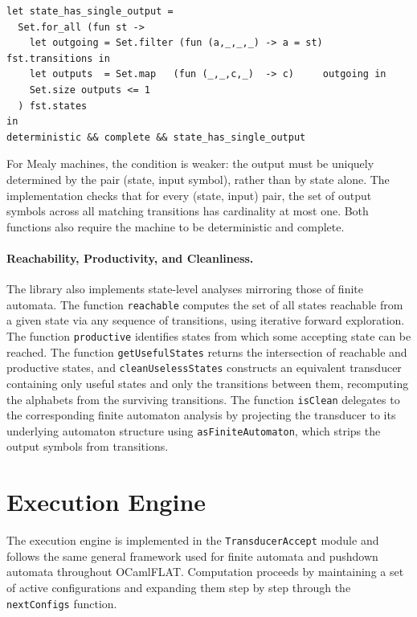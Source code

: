 \begin{verbatim}
let state_has_single_output =
  Set.for_all (fun st ->
    let outgoing = Set.filter (fun (a,_,_,_) -> a = st) fst.transitions in
    let outputs  = Set.map   (fun (_,_,c,_)  -> c)     outgoing in
    Set.size outputs <= 1
  ) fst.states
in
deterministic && complete && state_has_single_output
\end{verbatim}

For Mealy machines, the condition is weaker: the output must be uniquely determined by the pair (state, input symbol), 
rather than by state alone. The implementation checks that for every (state, input) pair, the set of output symbols across 
all matching transitions has cardinality at most one. Both functions also require the machine to be deterministic and complete.

\paragraph{Reachability, Productivity, and Cleanliness.}
The library also implements state-level analyses mirroring those of finite automata. The function \texttt{reachable} 
computes the set of all states reachable from a given state via any sequence of transitions, using iterative forward exploration. 
The function \texttt{productive} identifies states from which some accepting state can be reached. 
The function \texttt{getUsefulStates} returns the intersection of reachable and productive states, 
and \texttt{cleanUselessStates} constructs an equivalent transducer containing only useful states and 
only the transitions between them, recomputing the alphabets from the surviving transitions. The function \texttt{isClean} 
delegates to the corresponding finite automaton analysis by projecting the transducer to its underlying automaton structure 
using \texttt{asFiniteAutomaton}, which strips the output symbols from transitions.

\section{Execution Engine}
\label{sec:back_execution}

The execution engine is implemented in the \texttt{TransducerAccept} module and follows the same general framework used for 
finite automata and pushdown automata throughout OCamlFLAT. Computation proceeds by maintaining a set of active configurations 
and expanding them step by step through the \texttt{nextConfigs} function.

